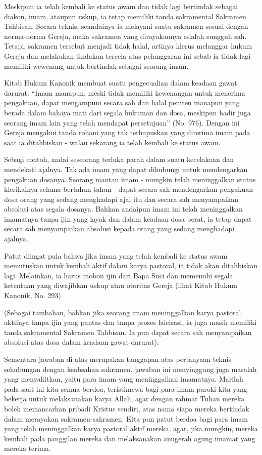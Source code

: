 Meskipun ia telah kembali ke status awam dan tidak lagi bertindak sebagai diakon, imam, ataupun uskup, ia tetap memiliki tanda sakramental Sakramen Tahbisan. Secara teknis, seandainya ia melayani suatu sakramen sesuai dengan norma-norma Gereja, maka sakramen yang dirayakannya adalah sungguh sah. Tetapi, sakramen tersebut menjadi tidak halal, artinya klerus melanggar hukum Gereja dan melakukan tindakan tercela atas pelanggaran ini sebab ia tidak lagi memiliki wewenang untuk bertindak sebagai seorang imam.

Kitab Hukum Kanonik membuat suatu pengecualian dalam keadaan gawat darurat: “Imam manapun, meski tidak memiliki kewenangan untuk menerima pengakuan, dapat mengampuni secara sah dan halal peniten manapun yang berada dalam bahaya mati dari segala hukuman dan dosa, meskipun hadir juga seorang imam lain yang telah mendapat persetujuan” (No. 976). Dengan ini Gereja mengakui tanda rohani yang tak terhapuskan yang diterima imam pada saat ia ditahbiskan - walau sekarang ia telah kembali ke status awam.

Sebagi contoh, andai seseorang terluka parah dalam suatu kecelakaan dan mendekati ajalnya. Tak ada imam yang dapat dihubungi untuk mendengarkan pengakuan dosanya. Seorang mantan imam - mungkin telah meninggalkan status klerikalnya selama bertahun-tahun - dapat secara sah mendengarkan pengakuan dosa orang yang sedang menghadapi ajal itu dan secara sah menyampaikan absolusi atas segala dosanya. Bahkan andaipun imam ini telah meninggalkan imamatnya tanpa ijin yang layak dan dalam keadaan dosa berat, ia tetap dapat secara sah menyampaikan absolusi kepada orang yang sedang menghadapi ajalnya.

Patut diingat pula bahwa jika imam yang telah kembali ke status awam memutuskan untuk kembali aktif dalam karya pastoral, ia tidak akan ditahbiskan lagi. Melainkan, ia harus mohon ijin dari Bapa Suci dan memenuhi segala ketentuan yang diwajibkan uskup atau otoritas Gereja (lihat Kitab Hukum Kanonik, No. 293).

(Sebagai tambahan, bahkan jika seorang imam meninggalkan karya pastoral aktifnya tanpa ijin yang pantas dan tanpa proses laicisasi, ia juga masih memiliki tanda sakramental Sakramen Tahbisan. Ia pun dapat secara sah menyampaikan absolusi atas dosa dalam keadaan gawat darurat).

Sementara jawaban di atas merupakan tanggapan atas pertanyaan teknis sehubungan dengan keabsahan sakramen, jawaban ini menyinggung juga masalah yang menyakitkan, yaitu para imam yang meninggalkan imamatnya. Marilah pada saat ini kita semua berdoa, teristimewa bagi para imam paroki kita yang bekerja untuk melaksanakan karya Allah, agar dengan rahmat Tuhan mereka boleh memancarkan pribadi Kristus sendiri, atas nama siapa mereka bertindak dalam merayakan sakramen-sakramen. Kita pun patut berdoa bagi para imam yang telah meninggalkan karya pastoral aktif mereka, agar, jika mungkin, mereka kembali pada panggilan mereka dan melaksanakan anugerah agung imamat yang mereka terima.

